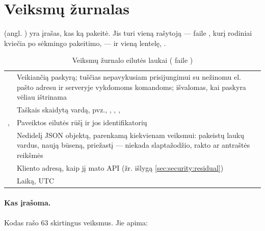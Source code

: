\section{Veiksmų žurnalas}\label{sec:security:audit}

 (angl. ) yra įrašas, kas ką pakeitė. Jis turi vieną
rašytoją ---  faile , kurį rodiniai kviečia po sėkmingo
pakeitimo, --- ir vieną lentelę, .

\begin{table}[H]
\caption{Veiksmų žurnalo eilutės laukai ( faile )}\label{tab:security:audit}
\begin{tabularx}{\textwidth}{@{}L{30mm}Y@{}}
\toprule
{} &  \\
\midrule
{} & Veikiančią paskyrą; tuščias nepavykusiam prisijungimui su nežinomu el. pašto adresu ir serveryje vykdomoms komandoms; išvalomas, kai paskyra vėliau ištrinama \\
 & Taškais skaidytą vardą, pvz., , , ,  \\
,  & Paveiktos eilutės rūšį ir jos identifikatorių \\
 & Nedidelį JSON objektą, parenkamą kiekvienam veiksmui: pakeistų laukų vardus, naują būseną, priežastį --- niekada slaptažodžio, rakto ar antraštės reikšmės \\
 & Kliento adresą, kaip jį mato API (žr. išlygą \cref{sec:security:residual}) \\
 & Laiką, UTC \\
\bottomrule
\end{tabularx}
\end{table}

\paragraph{Kas įrašoma.} Kodas rašo 63 skirtingus veiksmus. Jie apima:

